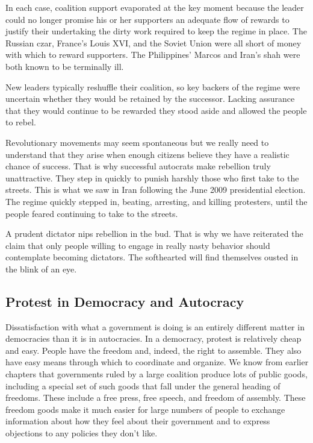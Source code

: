 \documentclass[10pt]{article}
\begin{document}
{\large In each case, coalition support evaporated at the key moment because the
leader could no longer promise his or her supporters an adequate flow of rewards
to justify their undertaking the dirty work required to keep the regime in place.
The Russian czar, France's Louis XVI, and the Soviet Union were all short of
money with which to reward supporters. The Philippines' Marcos and Iran's shah
were both known to be terminally ill.}

{\large New leaders typically reshuffle their coalition, so key backers of the
regime were uncertain whether they would be retained by the successor. Lacking
assurance that they would continue to be rewarded they stood aside and allowed
the people to rebel.}

{\large Revolutionary movements may seem spontaneous but we really need to
understand that they arise when enough citizens believe they have a realistic
chance of success. That is why successful autocrats make rebellion truly
unattractive. They step in quickly to punish harshly those who first take to the
streets. This is what we saw in Iran following the June 2009 presidential
election. The regime quickly stepped in, beating, arresting, and killing
protesters, until the people feared continuing to take to the streets.}

{\large A prudent dictator nips rebellion in the bud. That is why we have
reiterated the claim that only people willing to engage in really nasty behavior
should contemplate becoming dictators. The softhearted will find themselves
ousted in the blink of an eye.}

\subsection{Protest in Democracy and Autocracy}

{\large Dissatisfaction with what a government is doing is an entirely different
matter in democracies than it is in autocracies. In a democracy, protest is
relatively cheap and easy. People have the freedom and, indeed, the right to
assemble. They also have easy means through which to coordinate and organize. We
know from earlier chapters that governments ruled by a large coalition produce
lots of public goods, including a special set of such goods that fall under the
general heading of freedoms. These include a free press, free speech, and freedom
of assembly. These freedom goods make it much easier for large numbers of people
to exchange information about how they feel about their government and to express
objections to any policies they don't like.}
\end{document}
